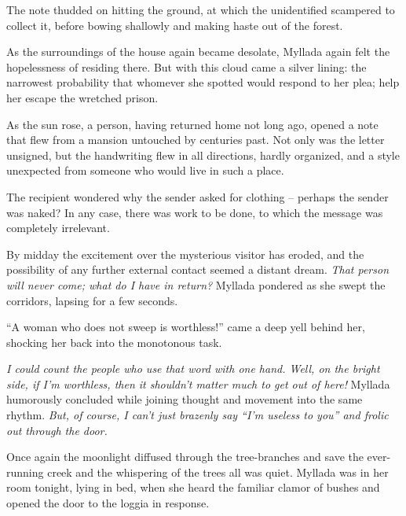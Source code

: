 The note thudded on hitting the ground, at which the unidentified scampered to collect it, before bowing shallowly and making haste out of the forest.

As the surroundings of the house again became desolate, Myllada again felt the hopelessness of residing there. But with this cloud came a silver lining: the narrowest probability that whomever she spotted would respond to her plea; help her escape the wretched prison.

\centeredstars

As the sun rose, a person, having returned home not long ago, opened a note that flew from a mansion untouched by centuries past. Not only was the letter unsigned, but the handwriting flew in all directions, hardly organized, and a style unexpected from someone who would live in such a place.


The recipient wondered why the sender asked for clothing -- perhaps the sender was naked? In any case, there was work to be done, to which the message was completely irrelevant.

\centeredstars

By midday the excitement over the mysterious visitor has eroded, and the possibility of any further external contact seemed a distant dream. \emph{That person will never come; what do I have in return?} Myllada pondered as she swept the corridors, lapsing for a few seconds.

``A woman who does not sweep is worthless!'' came a deep yell behind her, shocking her back into the monotonous task.

\emph{I could count the people who use that word with one hand. Well, on the bright side, if I'm worthless, then it shouldn't matter much to get out of here!} Myllada humorously concluded while joining thought and movement into the same rhythm. \emph{But, of course, I can't just brazenly say ``I'm useless to you'' and frolic out through the door.}

\centeredstars

Once again the moonlight diffused through the tree-branches and save the ever-running creek and the whispering of the trees all was quiet. Myllada was in her room tonight, lying in bed, when she heard the familiar clamor of bushes and opened the door to the loggia in response.


